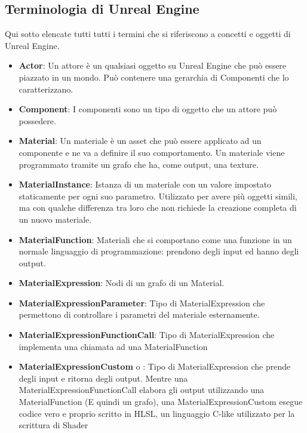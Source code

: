 \documentclass[main.tex]{subfiles}
\begin{document}
\subsection{Terminologia di Unreal Engine}\label{subsec:1_dataStructsUE}
Qui sotto elencate tutti tutti i termini che si riferiscono a concetti e oggetti di Unreal Engine.
\begin{itemize}
    \item \textbf{Actor}: Un attore è un qualsiasi oggetto su Unreal Engine che può essere piazzato in un mondo. Può contenere una gerarchia di Componenti che lo caratterizzano.
    \item \textbf{Component}: I componenti sono un tipo di oggetto che un attore può possedere.
    \item \textbf{Material}: Un materiale è un asset che può essere applicato ad un componente e ne va a definire il suo comportamento. Un materiale viene programmato tramite un grafo che ha, come output, una texture.
    \item \textbf{MaterialInstance}: Istanza di un materiale con un valore impostato staticamente per ogni suo parametro. Utilizzato per avere più oggetti simili, ma con qualche differenza tra loro che non richiede la creazione completa di un nuovo materiale.
    \item \textbf{MaterialFunction}: Materiali che si comportano come una funzione in un normale linguaggio di programmazione: prendono degli input ed hanno degli output.
    \item \textbf{MaterialExpression}: Nodi di un grafo di un Material.
    \item \textbf{MaterialExpressionParameter}: Tipo di MaterialExpression che permettono di controllare i parametri del materiale esternamente.
    \item \textbf{MaterialExpressionFunctionCall}: Tipo di MaterialExpression che implementa una chiamata ad una MaterialFunction
    \item \textbf{MaterialExpressionCustom} o : Tipo di MaterialExpression che prende degli input e ritorna degli output. Mentre una MaterialExpressionFunctionCall elabora gli output utilizzando una MaterialFunction (E quindi un grafo), una MaterialExpressionCustom esegue codice vero e proprio scritto in HLSL, un linguaggio C-like utilizzato per la scrittura di Shader
\end{itemize}
\end{document}
